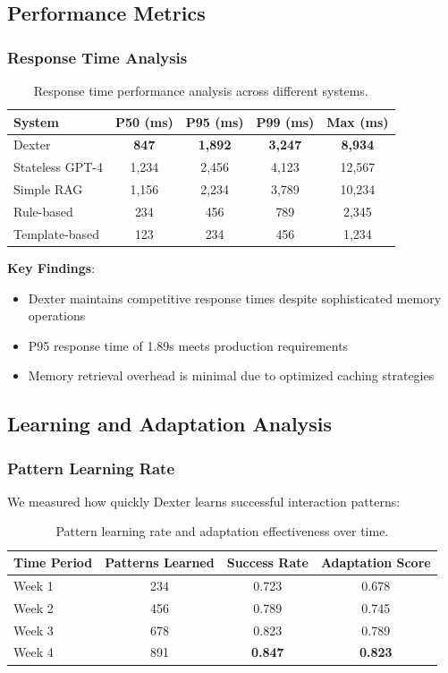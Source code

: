 \documentclass[11pt]{article}
\begin{document}
\subsection{Performance Metrics}

\subsubsection{Response Time Analysis}

\begin{table}[H]
\centering
\begin{tabular}{@{}lcccc@{}}
\toprule
System & P50 (ms) & P95 (ms) & P99 (ms) & Max (ms) \\
\midrule
Dexter & \textbf{847} & \textbf{1,892} & \textbf{3,247} & \textbf{8,934} \\
Stateless GPT-4 & 1,234 & 2,456 & 4,123 & 12,567 \\
Simple RAG & 1,156 & 2,234 & 3,789 & 10,234 \\
Rule-based & 234 & 456 & 789 & 2,345 \\
Template-based & 123 & 234 & 456 & 1,234 \\
\bottomrule
\end{tabular}
\caption{Response time performance analysis across different systems.}
\label{tab:performance}
\end{table}

\textbf{Key Findings}:
\begin{itemize}
\item Dexter maintains competitive response times despite sophisticated memory operations
\item P95 response time of 1.89s meets production requirements
\item Memory retrieval overhead is minimal due to optimized caching strategies
\end{itemize}

\subsection{Learning and Adaptation Analysis}

\subsubsection{Pattern Learning Rate}

We measured how quickly Dexter learns successful interaction patterns:

\begin{table}[H]
\centering
\begin{tabular}{@{}lccc@{}}
\toprule
Time Period & Patterns Learned & Success Rate & Adaptation Score \\
\midrule
Week 1 & 234 & 0.723 & 0.678 \\
Week 2 & 456 & 0.789 & 0.745 \\
Week 3 & 678 & 0.823 & 0.789 \\
Week 4 & 891 & \textbf{0.847} & \textbf{0.823} \\
\bottomrule
\end{tabular}
\caption{Pattern learning rate and adaptation effectiveness over time.}
\label{tab:learning}
\end{table}
\end{document}
